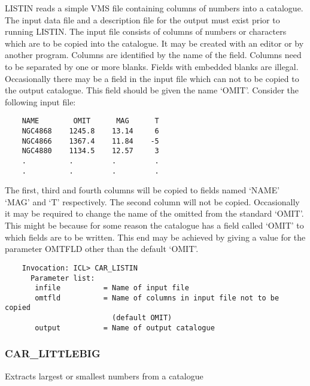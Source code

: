 LISTIN reads a simple VMS file containing columns of numbers into a
catalogue. The input data file and a description file for the output
must exist prior to running LISTIN.
The input file consists of columns of numbers or characters which are to 
be copied into the catalogue. 
It may be created with an editor or by another program. 
Columns are identified by the name of the field.
Columns need to be separated by one or more blanks.
Fields with embedded blanks are illegal.
Occasionally there may be a field in the input file which can not
to be copied to the output catalogue.  
This field should be given the name `OMIT'.  
Consider the following input file:
\begin{verbatim}
    NAME        OMIT      MAG      T
    NGC4868    1245.8    13.14     6
    NGC4866    1367.4    11.84    -5
    NGC4880    1134.5    12.57     3
    .          .         .         .
    .          .         .         .
\end{verbatim}
The first, third and fourth columns will be copied to fields named `NAME'
`MAG' and `T' respectively. 
The second column will not be copied.
Occasionally it may be required to change the name of the omitted
from the standard `OMIT'. 
This might be because for some reason the catalogue has a field called 
`OMIT' to which fields are to be written. 
This end may be achieved by giving a value for the parameter OMTFLD other 
than the default `OMIT'.
\begin{verbatim}
    Invocation: ICL> CAR_LISTIN
      Parameter list:
       infile          = Name of input file
       omtfld          = Name of columns in input file not to be copied
                         (default OMIT)
       output          = Name of output catalogue
\end{verbatim}

\subsubsection{CAR\_LITTLEBIG}

Extracts largest or smallest numbers from a catalogue


